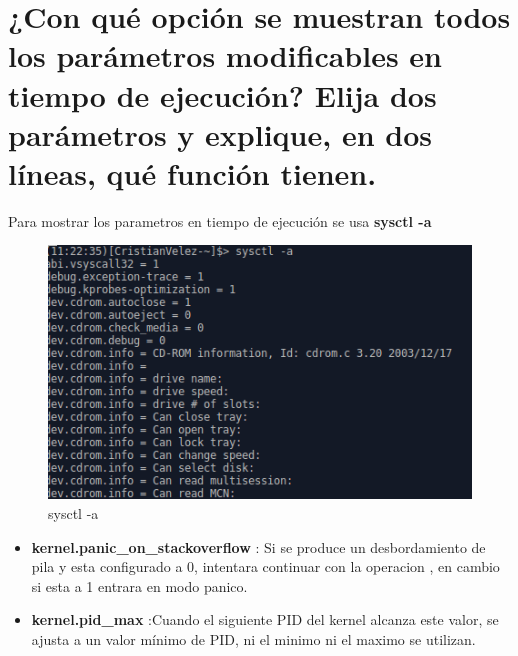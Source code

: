 

	
	

\section[Cuestión 2]{¿Con qué opción se muestran todos los parámetros modificables en tiempo de ejecución? Elija dos parámetros y explique, en dos líneas, qué función tienen.}

Para mostrar los parametros en tiempo de ejecución se usa \textbf{sysctl -a} \cite{kernel}

\begin{figure}[H] %
	\centering
	\includegraphics[scale=0.5]{pics/a}  %
	\caption{sysctl -a} \label{fig:kernel4}
\end{figure}

\begin{itemize}
	\item \textbf{kernel.panic\_on\_stackoverflow} : Si se produce un desbordamiento de pila y esta configurado a 0, intentara continuar con la operacion , en cambio si esta a 1 entrara en modo panico.
	
	\item \textbf{kernel.pid\_max} :Cuando el siguiente PID del kernel alcanza este valor, se ajusta a un valor mínimo de PID, ni el minimo ni el maximo se utilizan.
\end{itemize}


